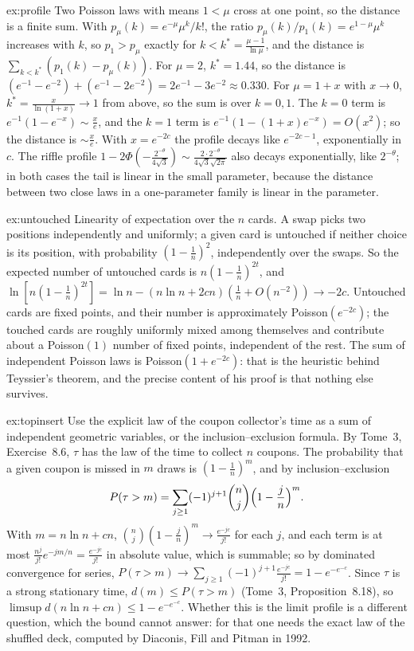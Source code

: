 \begin{solution}{ex:profile}
\idea Two Poisson laws with means $1<\mu$ cross at one point, so the distance is a finite sum.
\writeup With $p_\mu(k)=e^{-\mu}\mu^k/k!$, the ratio $p_\mu(k)/p_1(k)=e^{1-\mu}\mu^k$ increases with $k$, so $p_1>p_\mu$ exactly for $k<k^*=\frac{\mu-1}{\ln\mu}$, and the distance is $\sum_{k<k^*}(p_1(k)-p_\mu(k))$. For
$\mu=2$, $k^*=1.44$, so the distance is $(e^{-1}-e^{-2})+(e^{-1}-2e^{-2})=2e^{-1}-3e^{-2}\approx0.330$. For $\mu=1+x$ with $x\to0$, $k^*=\frac x{\ln(1+x)}\to1$ from above, so the sum is over $k=0,1$. The $k=0$ term is $e^{-1}(1-e^{-x})\sim\frac xe$, and the $k=1$ term is
$e^{-1}(1-(1+x)e^{-x})=O(x^2)$; so the distance is $\sim\frac xe$. With
$x=e^{-2c}$ the profile decays like $e^{-2c-1}$, exponentially in $c$. The riffle profile $1-2\Phi(-\frac{2^{-\theta}}{4\sqrt3})\sim\frac{2\cdot2^{-\theta}}{4\sqrt3\sqrt{2\pi}}$ also decays exponentially, like $2^{-\theta}$; in both cases the tail is linear in the
small parameter, because the distance between two close laws in a one-parameter family is linear in the parameter.
\end{solution}

\begin{solution}{ex:untouched}
\idea Linearity of expectation over the $n$ cards.
\writeup A swap picks two positions independently and uniformly; a given card is untouched if neither choice is its position, with probability $(1-\frac1n)^2$, independently over the
swaps. So the expected number of untouched cards is $n(1-\frac1n)^{2t}$, and $\ln[n(1-\frac1n)^{2t}]=\ln n-(n\ln n+2cn)(\frac1n+O(n^{-2}))\to-2c$. Untouched cards are fixed points, and their number is
approximately Poisson$(e^{-2c})$; the touched cards are roughly uniformly mixed among themselves and contribute about a Poisson$(1)$ number of fixed points, independent of the
rest. The sum of independent Poisson laws is Poisson$(1+e^{-2c})$: that is the heuristic behind Teyssier's theorem, and the precise content of his proof is that nothing else survives.
\end{solution}

\begin{solution}{ex:topinsert}
\idea Use the explicit law of the coupon collector's time as a sum of independent geometric variables, or the inclusion--exclusion formula.
\writeup By Tome~3, Exercise~8.6, $\tau$ has the law of the time to collect $n$ coupons. The probability that a given coupon is missed in $m$ draws is $(1-\frac1n)^m$, and by inclusion--exclusion
\[
P(\tau>m)=\sum_{j\ge1}(-1)^{j+1}\binom nj\Bigl(1-\frac jn\Bigr)^m.
\]
With $m=n\ln n+cn$, $\binom nj(1-\frac jn)^m\to\frac{e^{-jc}}{j!}$ for each $j$, and each term is at most $\frac{n^j}{j!}e^{-jm/n}=\frac{e^{-jc}}{j!}$ in absolute value, which is summable; so by dominated convergence for series,
$P(\tau>m)\to\sum_{j\ge1}(-1)^{j+1}\frac{e^{-jc}}{j!}=1-e^{-e^{-c}}$. Since $\tau$ is a strong stationary time, $d(m)\le P(\tau>m)$ (Tome~3, Proposition~8.18), so $\limsup d(n\ln n+cn)\le1-e^{-e^{-c}}$. Whether this
is the limit profile is a different question, which the bound cannot answer: for that one needs the exact law of the shuffled deck, computed by Diaconis, Fill and Pitman in 1992.
\end{solution}

